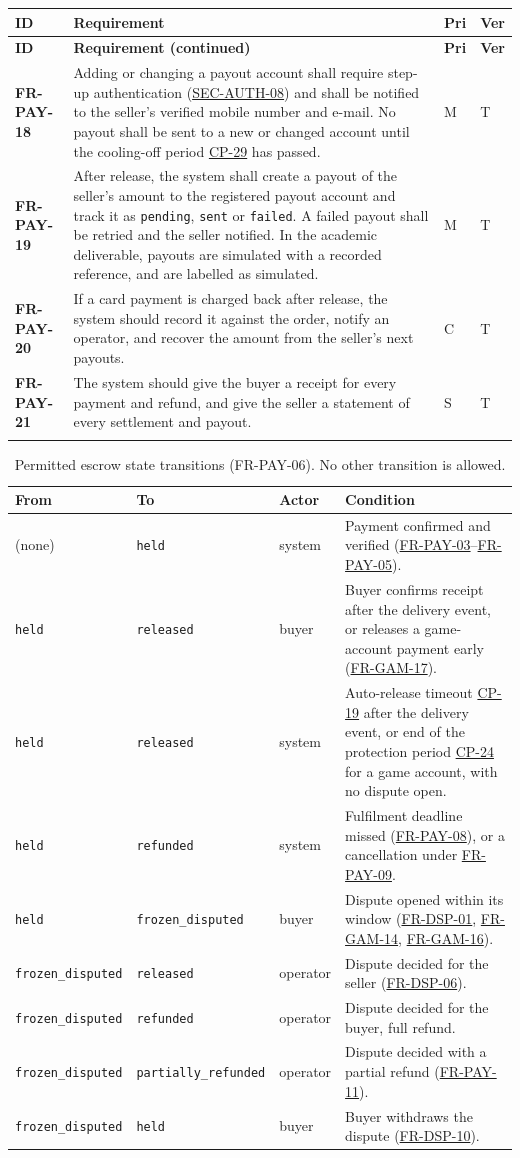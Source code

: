 \documentclass[11pt,a4paper]{report}
\makeatletter
\newenvironment{reqs}{%
  \small
  \begin{longtable}{@{}>{\raggedright\arraybackslash}p{2.35cm}
                       >{\raggedright\arraybackslash}p{10.3cm}
                       >{\centering\arraybackslash}p{0.7cm}
                       >{\centering\arraybackslash}p{0.7cm}@{}}
  \toprule
  \textbf{ID} & \textbf{Requirement} & \textbf{Pri} & \textbf{Ver} \\
  \midrule
  \endfirsthead
  \toprule
  \textbf{ID} & \textbf{Requirement (continued)} & \textbf{Pri} & \textbf{Ver} \\
  \midrule
  \endhead
  \bottomrule
  \endfoot
}{\end{longtable}}
\newcommand{\req}[5]{\leavevmode\textbf{#1}\hypertarget{#1}{} & #5 & #2 & #3 \\ \addlinespace[2pt]}
\newcommand{\rr}[1]{\hyperlink{#1}{#1}}
\newcommand{\cp}[1]{\hyperlink{#1}{#1}}
\makeatother
\begin{document}
\begin{reqs}
\req{FR-PAY-18}{M}{T}{new}{Adding or changing a payout account shall require step-up authentication (\rr{SEC-AUTH-08}) and shall be notified to the seller's verified mobile number and e-mail. No payout shall be sent to a new or changed account until the cooling-off period \cp{CP-29} has passed.}
\req{FR-PAY-19}{M}{T}{new}{After release, the system shall create a payout of the seller's amount to the registered payout account and track it as \texttt{pending}, \texttt{sent} or \texttt{failed}. A failed payout shall be retried and the seller notified. In the academic deliverable, payouts are simulated with a recorded reference, and are labelled as simulated.}
\req{FR-PAY-20}{C}{T}{new}{If a card payment is charged back after release, the system should record it against the order, notify an operator, and recover the amount from the seller's next payouts.}
\req{FR-PAY-21}{S}{T}{new}{The system should give the buyer a receipt for every payment and refund, and give the seller a statement of every settlement and payout.}
\end{reqs}

\begin{table}[!htbp]
\centering
\small
\caption{Permitted escrow state transitions (FR-PAY-06). No other transition is allowed.}
\label{tab:escrow}
\begin{tabularx}{\textwidth}{@{}l l l X@{}}
\toprule
\textbf{From} & \textbf{To} & \textbf{Actor} & \textbf{Condition} \\
\midrule
(none) & \texttt{held} & system & Payment confirmed and verified (\rr{FR-PAY-03}--\rr{FR-PAY-05}). \\
\texttt{held} & \texttt{released} & buyer & Buyer confirms receipt after the delivery event, or releases a game-account payment early (\rr{FR-GAM-17}). \\
\texttt{held} & \texttt{released} & system & Auto-release timeout \cp{CP-19} after the delivery event, or end of the protection period \cp{CP-24} for a game account, with no dispute open. \\
\texttt{held} & \texttt{refunded} & system & Fulfilment deadline missed (\rr{FR-PAY-08}), or a cancellation under \rr{FR-PAY-09}. \\
\texttt{held} & \texttt{frozen\_disputed} & buyer & Dispute opened within its window (\rr{FR-DSP-01}, \rr{FR-GAM-14}, \rr{FR-GAM-16}). \\
\texttt{frozen\_disputed} & \texttt{released} & operator & Dispute decided for the seller (\rr{FR-DSP-06}). \\
\texttt{frozen\_disputed} & \texttt{refunded} & operator & Dispute decided for the buyer, full refund. \\
\texttt{frozen\_disputed} & \texttt{partially\_refunded} & operator & Dispute decided with a partial refund (\rr{FR-PAY-11}). \\
\texttt{frozen\_disputed} & \texttt{held} & buyer & Buyer withdraws the dispute (\rr{FR-DSP-10}). \\
\bottomrule
\end{tabularx}
\end{table}
\end{document}
